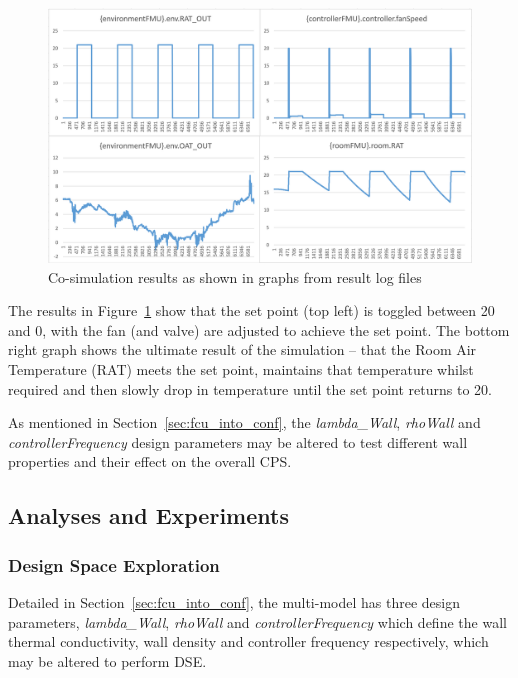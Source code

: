 \begin{figure}[htb!]
\begin{center}
   \includegraphics[width=1\linewidth]{fcu/fcu_results} 
  \caption{Co-simulation results as shown in graphs from result log files}
\label{fig:fcu_results2}
\end{center}
\end{figure}

The results in Figure~\ref{fig:fcu_results2} show that the set point (top left) is toggled between 20 and 0, with the fan (and valve) are adjusted to achieve the set point. The bottom right graph shows the ultimate result of the simulation -- that the Room Air Temperature (RAT) meets the set point, maintains that temperature whilst required and then slowly drop in temperature until the set point returns to 20.

As mentioned in Section~\ref{sec:fcu_into_conf}, the  \emph{lambda\_Wall}, \emph{rhoWall} and \emph{controllerFrequency} design parameters may be altered to test different wall properties and their effect on the overall CPS.

\subsection{Analyses and Experiments}
\label{sec:fcu_analyses}

\subsubsection{Design Space Exploration}
\label{sec:fcu_dse}

Detailed in Section~\ref{sec:fcu_into_conf}, the multi-model has three design parameters, \emph{lambda\_Wall}, \emph{rhoWall} and \emph{controllerFrequency} which define the wall thermal conductivity, wall density and controller frequency respectively, which may be altered to perform DSE. 

